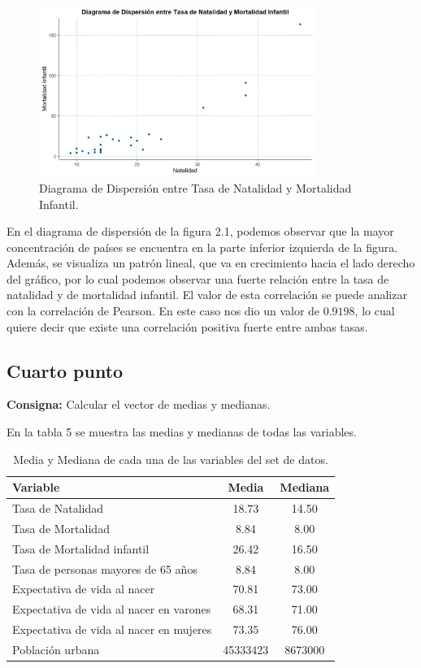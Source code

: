 \documentclass{article} %
\begin{document}
\begin{figure}[H]
	\centering
	\includegraphics[width=0.8\textwidth]{images/2-3 scatter}
	\caption{Diagrama de Dispersión entre Tasa de Natalidad y Mortalidad Infantil.}
	\label{fig:scatter1}
\end{figure}

En el diagrama de dispersión de la figura 2.1, podemos observar que la mayor concentración de países se encuentra en la parte inferior izquierda de la figura. Además, se visualiza un patrón lineal, que va en crecimiento hacia el lado derecho del gráfico, por lo cual podemos observar una fuerte relación entre la tasa de natalidad y de mortalidad infantil. El valor de esta correlación se puede analizar con la correlación de Pearson. En este caso nos dio un valor de $0.9198$, lo cual quiere decir que existe una correlación positiva fuerte entre ambas tasas.

\subsection{Cuarto punto}

\textbf{Consigna:} Calcular el vector de medias y medianas.

En la tabla 5 se muestra las medias y medianas de todas las variables.

\begin{table}[H]
	\centering
		\begin{tabular}{||l || c | c ||}
			\hline
			\hline
			Variable & Media & Mediana\\
			\hline			
			\hline
			Tasa de Natalidad & 18.73 & 14.50\\
			\hline
			Tasa de Mortalidad & 8.84 & 8.00\\
			\hline
			Tasa de Mortalidad infantil & 26.42 & 16.50\\
			\hline
			Tasa de personas mayores de 65 años & 8.84 & 8.00\\
			\hline
			Expectativa de vida al nacer & 70.81 & 73.00\\
			\hline
			Expectativa de vida al nacer en varones & 68.31 & 71.00\\
			\hline
			Expectativa de vida al nacer en mujeres & 73.35 & 76.00\\
			\hline
			Población urbana & 45333423 & 8673000\\
			\hline
			\hline
		\end{tabular}
		\caption{Media y Mediana de cada una de las variables del set de datos.}
	\label{tab:table-punto-2-4}
\end{table}
\end{document}
